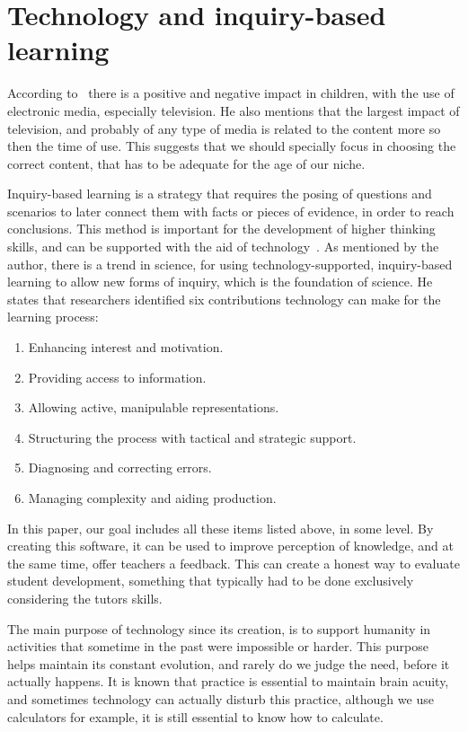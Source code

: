 \documentclass[a4paper,twoside]{article}
\begin{document}
\section{Technology and inquiry-based learning}
\noindent According to~\cite{kirkorian2008media} there is a positive and negative impact in children, with the use of electronic media, especially television. He also mentions that the largest impact of television, and probably of any type of media is related to the content more so then the time of use. This suggests that we should specially focus in choosing the correct content, that has to be adequate for the age of our niche.

Inquiry-based learning is a strategy that requires the posing of questions and scenarios to later connect them with facts or pieces of evidence, in order to reach conclusions. This method is important for the development of higher thinking skills, and can be supported with the aid of technology~\cite{edelson1999addressing}. As mentioned by the author, there is a trend in science, for using technology-supported, inquiry-based learning to allow new forms of inquiry, which is the foundation of science. He states that researchers identified six contributions technology can make for the learning process:
\begin{enumerate}
\item Enhancing interest and motivation.

\item Providing access to information.

\item Allowing active, manipulable representations.

\item Structuring the process with tactical and strategic support.

\item Diagnosing and correcting errors.

\item Managing complexity and aiding production.
\end{enumerate}

In this paper, our goal includes all these items listed above, in some level. By creating this software, it can be used to improve perception of knowledge, and at the same time, offer teachers a feedback. This can create a honest way to evaluate  student development, something that typically had to be done exclusively considering the tutors skills.

The main purpose of technology since its creation, is to support humanity in activities that sometime in the past were impossible or harder. This purpose helps maintain its constant evolution, and rarely do we judge the need, before it actually happens. It is known that practice is essential to maintain brain acuity, and sometimes technology can actually disturb this practice, although we use calculators for example, it is still essential to know how to calculate.
\end{document}
